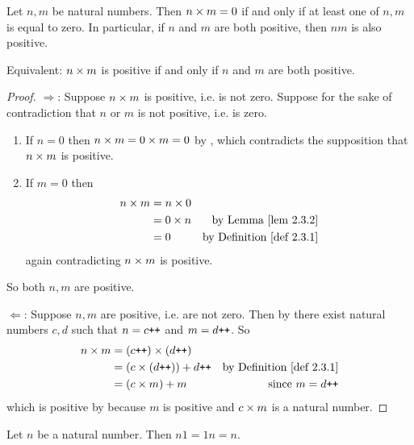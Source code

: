 \begin{lemma}\label{lem 2.3.3}
Let \(n, m\) be natural numbers. Then \(n \times m = 0\) if and only if at least one of \(n, m\) is equal to zero. In particular, if \(n\) and \(m\) are both positive, then \(nm\) is also positive.
\end{lemma}
\begin{note}
Equivalent: \(n \times m\) is positive if and only if \(n\) and \(m\) are both positive.
\end{note}
\begin{proof}

\(\Longrightarrow\): Suppose \(n \times m\) is positive, i.e. is not zero. Suppose for the sake of contradiction that \(n\) or \(m\) is not positive, i.e. is zero.
\begin{enumerate}
    \item If \(n = 0\) then \(n \times m = 0 \times m = 0\) by , which contradicts the supposition that \(n \times m\) is positive.
    \item If \(m = 0\) then
    \begin{align*}
        n \X m & = n \X 0 \\
               & = 0 \X n & \text{by \LEM{2.3.2}} \\
               & = 0 & \text{by \DEF{2.3.1}}
    \end{align*}
    again contradicting \(n \times m\) is positive.
\end{enumerate}
So both \(n, m\) are positive.

\(\Longleftarrow\): Suppose \(n, m\) are positive, i.e. are not zero. Then by  there exist natural numbers \(c, d\) such that \(n = c\texttt{++}\) and \(m = d\texttt{++}\). So
\begin{align*}
    n \X m & = (c\INC) \X (d\INC) \\
           & = (c \X (d\INC)) + d\INC & \text{by \DEF{2.3.1}} \\
           & = (c \X m) + m & \text{since \(m = d\INC\)} \\
\end{align*}
which is positive by  because \(m\) is positive and \(c \times m\) is a natural number.
\end{proof}

\begin{additional corollary}\label{ac 2.3.4}
Let \(n\) be a natural number.
Then \(n1 = 1n = n\).
\end{additional corollary}

